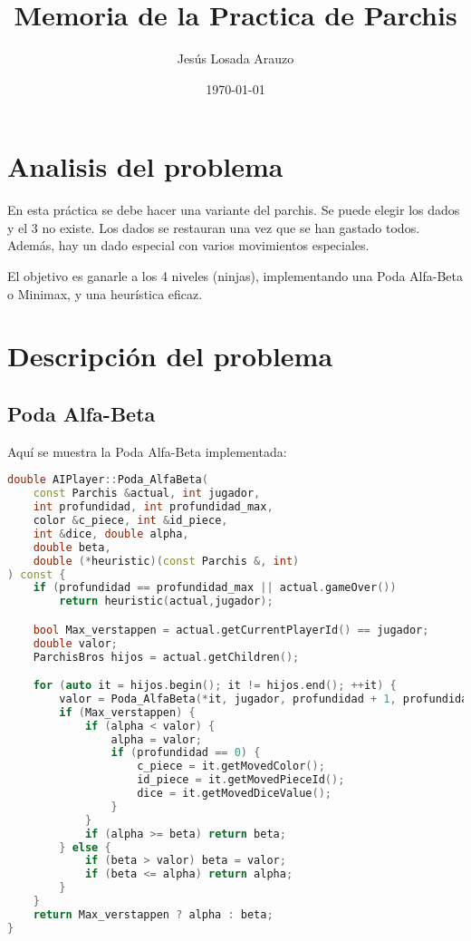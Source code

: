 \documentclass[a4paper, 11pt]{article}
\title{Memoria de la Practica de Parchis}
\author{Jesús Losada Arauzo}
\date{\today}
\begin{document}
\maketitle

\section{Analisis del problema}
En esta práctica se debe hacer una variante del parchis. Se puede elegir los dados y el 3 no existe. Los dados se restauran una vez que se han gastado todos. Además, hay un dado especial con varios movimientos especiales.

El objetivo es ganarle a los 4 niveles (ninjas), implementando una Poda Alfa-Beta o Minimax, y una heurística eficaz.

\section{Descripción del problema}

\subsection{Poda Alfa-Beta}
Aquí se muestra la Poda Alfa-Beta implementada:

\begin{lstlisting}[language=C++]
double AIPlayer::Poda_AlfaBeta(
    const Parchis &actual, int jugador, 
    int profundidad, int profundidad_max, 
    color &c_piece, int &id_piece, 
    int &dice, double alpha, 
    double beta, 
    double (*heuristic)(const Parchis &, int)
) const {
    if (profundidad == profundidad_max || actual.gameOver())
        return heuristic(actual,jugador);

    bool Max_verstappen = actual.getCurrentPlayerId() == jugador;
    double valor;
    ParchisBros hijos = actual.getChildren(); 

    for (auto it = hijos.begin(); it != hijos.end(); ++it) {   
        valor = Poda_AlfaBeta(*it, jugador, profundidad + 1, profundidad_max, c_piece, id_piece, dice, alpha, beta, heuristic);
        if (Max_verstappen) { 
            if (alpha < valor) { 
                alpha = valor;
                if (profundidad == 0) { 
                    c_piece = it.getMovedColor();
                    id_piece = it.getMovedPieceId();
                    dice = it.getMovedDiceValue();                  
                }
            }
            if (alpha >= beta) return beta;
        } else { 
            if (beta > valor) beta = valor;
            if (beta <= alpha) return alpha;
        }
    }
    return Max_verstappen ? alpha : beta;
}
\end{lstlisting}
\end{document}
